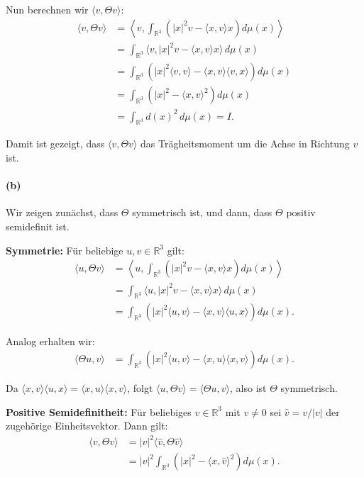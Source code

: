 \documentclass{article}
\newcommand{\R}{\mathbb{R}}
\begin{document}
Nun berechnen wir $\langle v, \Theta v \rangle$:
\begin{align}
\langle v, \Theta v \rangle &= \left\langle v, \int_{\R^3} \left( |x|^2v - \langle x, v\rangle x \right) d\mu(x) \right\rangle\\
&= \int_{\R^3} \langle v, |x|^2v - \langle x, v\rangle x \rangle \, d\mu(x)\\
&= \int_{\R^3} \left( |x|^2 \langle v, v \rangle - \langle x, v\rangle \langle v, x \rangle \right) d\mu(x)\\
&= \int_{\R^3} \left( |x|^2 - \langle x, v\rangle^2 \right) d\mu(x)\\
&= \int_{\R^3} d(x)^2 \, d\mu(x) = I.
\end{align}

Damit ist gezeigt, dass $\langle v, \Theta v \rangle$ das Trägheitsmoment um die Achse in Richtung $v$ ist.

\paragraph{(b)} Wir zeigen zunächst, dass $\Theta$ symmetrisch ist, und dann, dass $\Theta$ positiv semidefinit ist.

\textbf{Symmetrie:} Für beliebige $u, v \in \R^3$ gilt:
\begin{align}
\langle u, \Theta v \rangle &= \left\langle u, \int_{\R^3} \left( |x|^2v - \langle x, v\rangle x \right) d\mu(x) \right\rangle\\
&= \int_{\R^3} \langle u, |x|^2v - \langle x, v\rangle x \rangle \, d\mu(x)\\
&= \int_{\R^3} \left( |x|^2 \langle u, v \rangle - \langle x, v\rangle \langle u, x \rangle \right) d\mu(x).
\end{align}

Analog erhalten wir:
\begin{align}
\langle \Theta u, v \rangle &= \int_{\R^3} \left( |x|^2 \langle u, v \rangle - \langle x, u\rangle \langle x, v \rangle \right) d\mu(x).
\end{align}

Da $\langle x, v\rangle \langle u, x \rangle = \langle x, u\rangle \langle x, v \rangle$, folgt $\langle u, \Theta v \rangle = \langle \Theta u, v \rangle$, also ist $\Theta$ symmetrisch.

\textbf{Positive Semidefinitheit:} Für beliebiges $v \in \R^3$ mit $v \neq 0$ sei $\hat{v} = v/|v|$ der zugehörige Einheitsvektor. Dann gilt:
\begin{align}
\langle v, \Theta v \rangle &= |v|^2 \langle \hat{v}, \Theta \hat{v} \rangle\\
&= |v|^2 \int_{\R^3} \left( |x|^2 - \langle x, \hat{v}\rangle^2 \right) d\mu(x).
\end{align}
\end{document}
